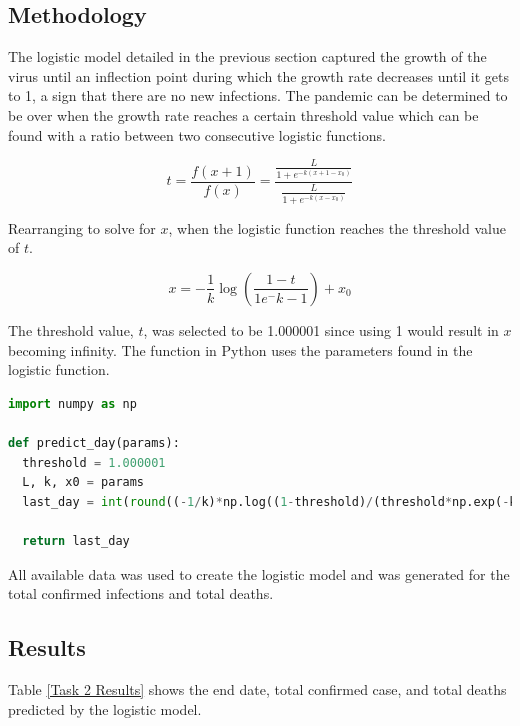 \documentclass{homework}
\begin{document}
\subsection{Methodology}

The logistic model detailed in the previous section captured the growth of the virus until an inflection point during which the growth rate decreases until it gets to 1, a sign that there are no new infections. The pandemic can be determined to be over when the growth rate reaches a certain threshold value which can be found with a ratio between two consecutive logistic functions.

\begin{equation*}
  t = \frac{f(x+1)}{f(x)} = \frac{\frac{L}{1+e^{-k(x+1-x_0)}}}{\frac{L}{1+e^{-k(x-x_0)}}}
\end{equation*}

Rearranging to solve for $x$, when the logistic function reaches the threshold value of $t$.

\begin{equation}
  x = -\frac{1}{k}\log(\frac{1-t}{1e^-k-1}) + x_0
\end{equation}

The threshold value, $t$, was selected to be 1.000001 since using 1 would result in $x$ becoming infinity. The function in Python uses the parameters found in the logistic function.

\begin{lstlisting}[language=Python, caption={Predicting the Last Day}, firstnumber=74]
import numpy as np

def predict_day(params): 
  threshold = 1.000001
  L, k, x0 = params
  last_day = int(round((-1/k)*np.log((1-threshold)/(threshold*np.exp(-k)-1))+x0))

  return last_day
\end{lstlisting}

All available data was used to create the logistic model and was generated for the total confirmed infections and total deaths.

\newpage
\subsection{Results}

Table \ref{Task 2 Results} shows the end date, total confirmed case, and total deaths predicted by the logistic model.
\end{document}
